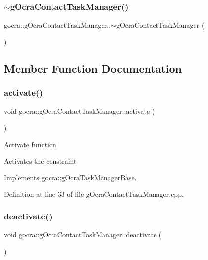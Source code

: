 \subsubsection{\texorpdfstring{$\sim$g\+Ocra\+Contact\+Task\+Manager()}{~gOcraContactTaskManager()}}
{\footnotesize\ttfamily gocra\+::g\+Ocra\+Contact\+Task\+Manager\+::$\sim$g\+Ocra\+Contact\+Task\+Manager (\begin{DoxyParamCaption}{ }\end{DoxyParamCaption})}



\subsection{Member Function Documentation}
\hypertarget{classgocra_1_1gOcraContactTaskManager_a51eef1bcdf87285b5b731356c6b46727}{}\label{classgocra_1_1gOcraContactTaskManager_a51eef1bcdf87285b5b731356c6b46727} 
\subsubsection{\texorpdfstring{activate()}{activate()}}
{\footnotesize\ttfamily void gocra\+::g\+Ocra\+Contact\+Task\+Manager\+::activate (\begin{DoxyParamCaption}{ }\end{DoxyParamCaption})\hspace{0.3cm}{\ttfamily [virtual]}}

Activate function

Activates the constraint 

Implements \hyperlink{classgocra_1_1gOcraTaskManagerBase_a50cf1c408749d6e9dcfaf50bcab77dee}{gocra\+::g\+Ocra\+Task\+Manager\+Base}.



Definition at line 33 of file g\+Ocra\+Contact\+Task\+Manager.\+cpp.

\hypertarget{classgocra_1_1gOcraContactTaskManager_adf02de85b4a661c70cd7e2031c1b7500}{}\label{classgocra_1_1gOcraContactTaskManager_adf02de85b4a661c70cd7e2031c1b7500} 
\subsubsection{\texorpdfstring{deactivate()}{deactivate()}}
{\footnotesize\ttfamily void gocra\+::g\+Ocra\+Contact\+Task\+Manager\+::deactivate (\begin{DoxyParamCaption}{ }\end{DoxyParamCaption})\hspace{0.3cm}{\ttfamily [virtual]}}

